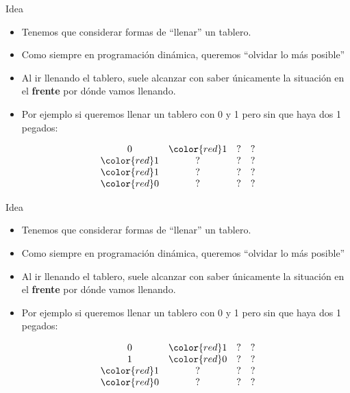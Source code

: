 \documentclass{beamer}
\begin{document}
\begin{frame}{Idea}
    \begin{itemize}
		\item Tenemos que considerar formas de ``llenar'' un tablero.
		\item Como siempre en programación dinámica, queremos ``olvidar lo más posible''
		\item Al ir llenando el tablero, suele alcanzar con saber únicamente la situación en el \textbf{frente} por dónde vamos llenando.
		\item Por ejemplo si queremos llenar un tablero con 0 y 1 pero sin que haya dos 1 pegados:
    \end{itemize}
    $$\begin{array}{cccc}
		0 & \color{red}1 & ? & ? \\
		\color{red}1 & ? & ? & ? \\
		\color{red}1 & ? & ? & ? \\
		\color{red}0 & ? & ? & ? \\
    \end{array}$$
\end{frame}

\begin{frame}{Idea}
    \begin{itemize}
		\item Tenemos que considerar formas de ``llenar'' un tablero.
		\item Como siempre en programación dinámica, queremos ``olvidar lo más posible''
		\item Al ir llenando el tablero, suele alcanzar con saber únicamente la situación en el \textbf{frente} por dónde vamos llenando.
		\item Por ejemplo si queremos llenar un tablero con 0 y 1 pero sin que haya dos 1 pegados:
    \end{itemize}
    $$\begin{array}{cccc}
		0 & \color{red}1 & ? & ? \\
		1 & \color{red}0 & ? & ? \\
		\color{red}1 & ? & ? & ? \\
		\color{red}0 & ? & ? & ? \\
    \end{array}$$
\end{frame}
\end{document}
